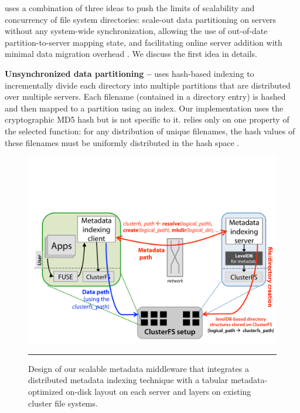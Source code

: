 \giga{} uses a combination of three ideas to push the limits of 
scalability and concurrency of file system directories: 
scale-out data partitioning on servers without any system-wide synchronization, 
allowing the use of out-of-date partition-to-server mapping state, and 
facilitating online server addition with minimal data migration overhead
\citep{GIGA}.
We discuss the first idea in details.

\textbf{Unsynchronized data partitioning -- }
\giga{} uses hash-based indexing to incrementally divide each directory into
multiple partitions that are distributed over multiple servers.
Each filename (contained in a directory entry) is hashed and then mapped to a 
partition using an index. 
Our implementation uses the cryptographic MD5 hash but is not specific
to it.
\giga{} relies only on one property of the selected function: for any 
distribution of unique filenames, the hash values of these filenames must 
be uniformly distributed in the hash space \citep{md5:rfc1321}.

\begin{figure}[t]   %
\centerline{\includegraphics[scale=0.3]{./figs/giga-impl-leveldb-clusterfs}}
\caption{
{\small
Design of our scalable metadata middleware that integrates a distributed metadata indexing
technique with a tabular metadata-optimized on-disk layout on each server and
layers on existing cluster file systems. 
}
}
\vspace{10pt}
\hrule 
\label{fig:design}
\end{figure}       %

